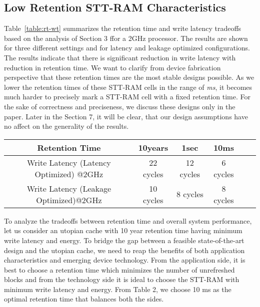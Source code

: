 \subsection{Low Retention STT-RAM Characteristics}
Table~\ref{table:rt-wt} summarizes the retention time and write latency tradeoffs based on the analysis of Section 3
ffor a 2GHz processor.
The results are shown for three different settings and for latency and leakage optimized configurations.
The results indicate that there is significant reduction in write latency with reduction in retention time.
We want to clarify from device fabrication perspective that these retention times are the most stable designs possible.
As we lower the retention times of these STT-RAM cells in the range of {\it ms}, it becomes much harder
to precisely mark a STT-RAM cell with a fixed retention time. For the sake of correctness and preciseness,
we discuss these designs only in the paper.
Later in the Section 7, it will be clear, that our design assumptions have no affect on the generality of the results.

\begin{table*}[t]
  \centering
  \caption{Retention and Write Latencies for STT-RAM L2 Cache}
  \label{table:rt-wt}
  \begin{tabular}{| c | c | c | c | c | c |}
  	\hline
	 Retention Time & 10years & 1sec &10ms \\
	\hline
	Write Latency (Latency Optimized) @2GHz & 22 cycles & 12 cycles & 6 cycles \\
	\hline
	Write Latency (Leakage Optimized)@2GHz & 10 cycles & 8 cycles & 8 cycles \\
	\hline
  \end{tabular}
\end{table*}

To analyze the tradeoffs between retention time and overall system performance, let us consider an utopian cache
with 10 year retention time having minimum write latency and energy.  To bridge the gap between a
feasible state-of-the-art design and the utopian cache, we need to reap the benefits of both application
characteristics and emerging device technology. From the application side, it is best to choose a retention time
which minimizes the number of unrefreshed blocks and from the technology side it is ideal to choose the
STT-RAM with minimum write latency and energy. From Table 2, we choose 10 ms as the optimal retention time that
balances both the sides.








